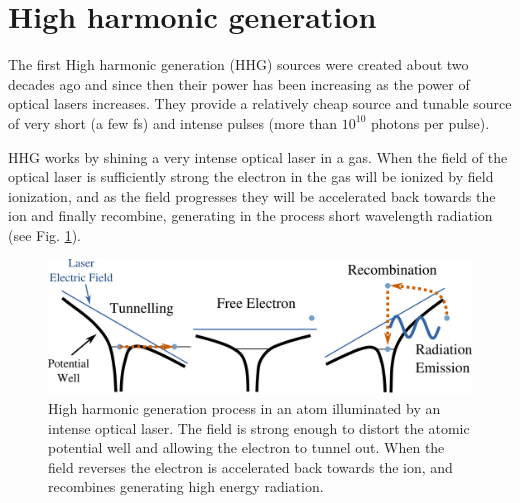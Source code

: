 \section{High harmonic generation}

The first High harmonic generation (HHG) sources were created about two decades ago
and since then their power has been increasing as the power of optical lasers
increases. They provide a relatively cheap source and tunable source of very
short (a few fs) and intense pulses (more than $10^{10}$ photons per pulse). 

HHG works by shining a very intense optical laser in a gas. When the field of
the optical laser is sufficiently strong the electron in the gas will be ionized
by field ionization, and as the field progresses they will be accelerated back
towards the ion and finally recombine, generating in the process short
wavelength radiation (see Fig. \ref{Fig:HHG_Process}).

\begin{figure}[h]
\centering
  \includegraphics[width=1.0 \columnwidth]{HHG_Picture1.png}
  \caption{High harmonic generation process in an atom illuminated by an intense
    optical laser. The field is strong enough to distort the atomic potential
    well and allowing the electron to tunnel out. When the field reverses the
    electron is accelerated back towards the ion, and recombines generating high
    energy radiation. \cite{Corkum93,Lewenstein94}}
  \label{Fig:HHG_Process}
\end{figure}


